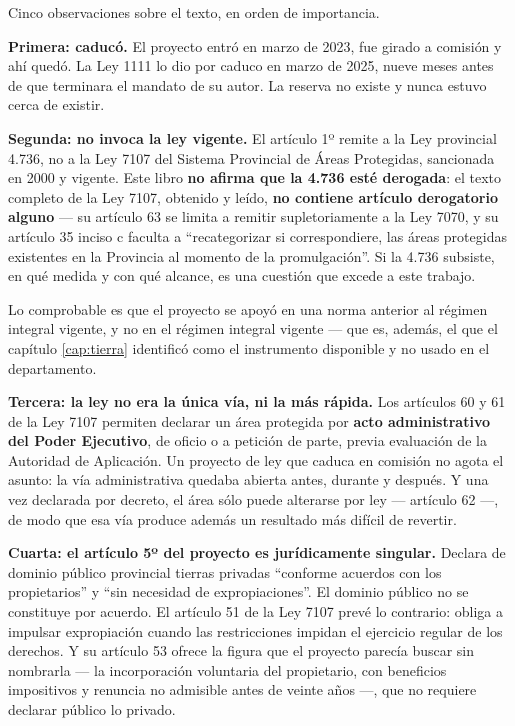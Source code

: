 \begin{cautela}
Cinco observaciones sobre el texto, en orden de importancia.

\textbf{Primera: caducó.} El proyecto entró en marzo de 2023, fue girado a comisión y ahí quedó. La Ley 1111 lo dio por caduco en marzo de 2025, nueve meses antes de que terminara el mandato de su autor. La reserva no existe y nunca estuvo cerca de existir.

\textbf{Segunda: no invoca la ley vigente.} El artículo 1º remite a la Ley provincial 4.736, no a la Ley 7107 del Sistema Provincial de Áreas Protegidas, sancionada en 2000 y vigente. Este libro \textbf{no afirma que la 4.736 esté derogada}: el texto completo de la Ley 7107, obtenido y leído, \textbf{no contiene artículo derogatorio alguno} --- su artículo 63 se limita a remitir supletoriamente a la Ley 7070, y su artículo 35 inciso c faculta a ``recategorizar si correspondiere, las áreas protegidas existentes en la Provincia al momento de la promulgación''. Si la 4.736 subsiste, en qué medida y con qué alcance, es una cuestión que excede a este trabajo.

Lo comprobable es que el proyecto se apoyó en una norma anterior al régimen integral vigente, y no en el régimen integral vigente --- que es, además, el que el capítulo \ref{cap:tierra} identificó como el instrumento disponible y no usado en el departamento.

\textbf{Tercera: la ley no era la única vía, ni la más rápida.} Los artículos 60 y 61 de la Ley 7107 permiten declarar un área protegida por \textbf{acto administrativo del Poder Ejecutivo}, de oficio o a petición de parte, previa evaluación de la Autoridad de Aplicación. Un proyecto de ley que caduca en comisión no agota el asunto: la vía administrativa quedaba abierta antes, durante y después. Y una vez declarada por decreto, el área sólo puede alterarse por ley --- artículo 62 ---, de modo que esa vía produce además un resultado más difícil de revertir.

\textbf{Cuarta: el artículo 5º del proyecto es jurídicamente singular.} Declara de dominio público provincial tierras privadas ``conforme acuerdos con los propietarios'' y ``sin necesidad de expropiaciones''. El dominio público no se constituye por acuerdo. El artículo 51 de la Ley 7107 prevé lo contrario: obliga a impulsar expropiación cuando las restricciones impidan el ejercicio regular de los derechos. Y su artículo 53 ofrece la figura que el proyecto parecía buscar sin nombrarla --- la incorporación voluntaria del propietario, con beneficios impositivos y renuncia no admisible antes de veinte años ---, que no requiere declarar público lo privado.


\end{cautela}
